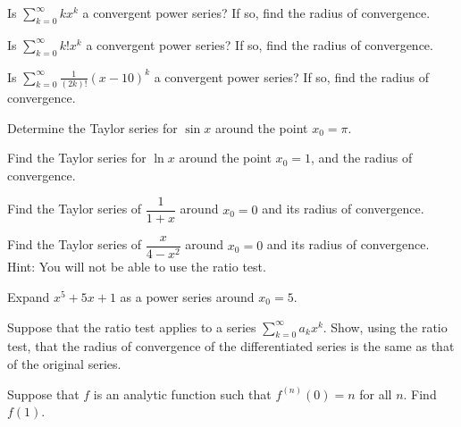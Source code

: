 \begin{exercise}
Is $\displaystyle \sum_{k=0}^\infty k x^k$ a convergent power series?
If so, find the radius of convergence.
\end{exercise}

\begin{exercise}
Is $\displaystyle \sum_{k=0}^\infty k! x^k$ a convergent power series?
If so, find the radius of convergence.
\end{exercise}

\begin{exercise}
Is $\displaystyle \sum_{k=0}^\infty \frac{1}{(2k)!} {(x-10)}^k$
a convergent power series?  If so, find the radius of convergence.
\end{exercise}

\begin{exercise}
Determine the Taylor series for $\sin x$ around the point $x_0 = \pi$.
\end{exercise}

\begin{exercise}
Find the Taylor series for $\ln x$ around the point $x_0 = 1$,
and the radius of convergence.
\end{exercise}

\begin{exercise}
Find the Taylor series
of $\dfrac{1}{1+x}$
around $x_0 = 0$
and its radius of convergence.
\end{exercise}

\begin{exercise}
Find the Taylor series of
$\dfrac{x}{4-x^2}$ around $x_0 = 0$
and its radius of convergence.
Hint: You will not be able to
use the ratio test.
\end{exercise}

\begin{exercise}
Expand $x^5+5x+1$ as a power series around $x_0 = 5$.
\end{exercise}

\begin{exercise}
Suppose that the ratio test applies to a series
$\displaystyle \sum_{k=0}^\infty a_k x^k$.  Show, using the ratio
test, that the radius of convergence of the differentiated
series is the same as that of the original series.
\end{exercise}

\begin{exercise}
Suppose that $f$ is an analytic function such that
$f^{(n)}(0) = n$ for all $n$.  Find $f(1)$.
\end{exercise}

